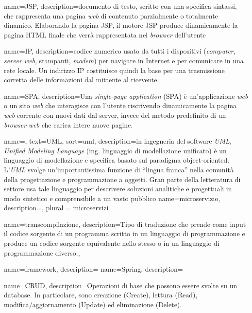{
    name=JSP,
    description={documento di testo, scritto con una specifica sintassi, che rappresenta una pagina \textit{web} di contenuto parzialmente o totalmente dinamico. Elaborando la pagina JSP, il motore JSP produce dinamicamente la pagina HTML finale che verrà rappresentata nel \textit{browser} dell'utente}
}

{
    name=IP,
    description={codice numerico usato da tutti i dispositivi (\textit{computer}, \textit{server web}, stampanti, \textit{modem}) per navigare in Internet e per comunicare in una rete locale. Un indirizzo IP costituisce quindi la base per una trasmissione corretta delle informazioni dal mittente al ricevente.}
}

{
    name=SPA,
    description={Una \textit{single-page application} (SPA) è un'applicazione \textit{web} o un sito \textit{web} che interagisce con l'utente riscrivendo dinamicamente la pagina \textit{web} corrente con nuovi dati dal server, invece del metodo predefinito di un \textit{browser} \textit{web} che carica intere nuove pagine.}
}

{
    name=,
    text=UML,
    sort=uml,
    description={in ingegneria del software \emph{UML, Unified Modeling Language} (ing. linguaggio di modellazione unificato) è un linguaggio di modellazione e specifica basato sul paradigma object-oriented. L'\emph{UML} svolge un'importantissima funzione di ``lingua franca'' nella comunità della progettazione e programmazione a oggetti. Gran parte della letteratura di settore usa tale linguaggio per descrivere soluzioni analitiche e progettuali in modo sintetico e comprensibile a un vasto pubblico}
}
{
    name={microservizio},
    description={},
    plural = {microservizi}
}

{
    name={transcompilazione},
    description={Tipo di traduzione 
    che prende come input il codice sorgente di un programma scritto in un linguaggio di programmazione e produce un codice sorgente equivalente nello stesso o in un linguaggio di programmazione diverso.},
}


{
    name={framework},
    description={}
}
{
    name={Spring},
    description={}
}

{
    name={CRUD},
    description={Operazioni di base che possono essere svolte su un database. In particolare,
    sono creazione (Create), lettura (Read), modifica/aggiornamento (Update) ed
    eliminazione (Delete).}
}

